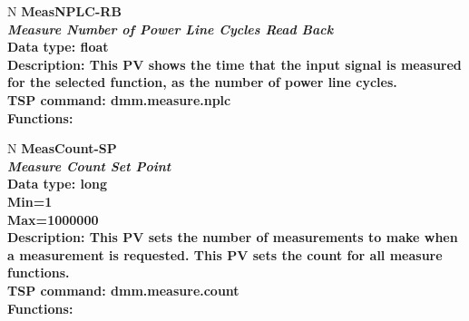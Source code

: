\documentclass[openany]{article}
\begin{document}
		\begin{tabular}{N}		
			\hline
			\bfseries MeasNPLC-RB\label{pv:measnplc-rb} \\ \hline
			\emph{Measure Number of Power Line Cycles Read Back} \\
			Data type: float \\
			Description: This PV shows the time that the input signal is measured for the selected function, as the number of power line cycles. \\
			TSP command: dmm.measure.nplc \\
			Functions: \\
			\arrayrulecolor{\FuncTableBorderColor}

		\end{tabular}

		\begin{tabular}{N}
			\hline		
			\bfseries MeasCount-SP\label{pv:meascount-sp} \\ \hline
			\emph{Measure Count Set Point} \\
			Data type: long \\
			Min=1 \\
			Max=1000000 \\
			Description: This PV sets the number of measurements to make when a measurement is requested. This PV sets the count for all measure functions. \\
			TSP command: dmm.measure.count \\
			Functions: \\
			\arrayrulecolor{\FuncTableBorderColor}

		\end{tabular}
\end{document}

